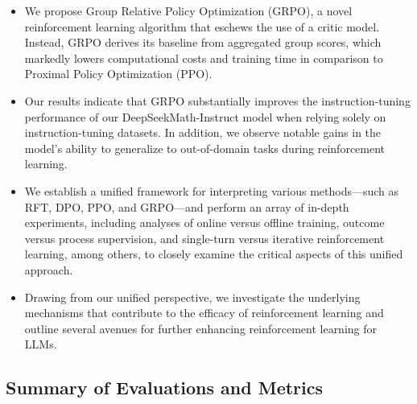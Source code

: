 \begin{itemize}[topsep=0pt]
    \item We propose Group Relative Policy Optimization (GRPO), a novel reinforcement learning algorithm that eschews the use of a critic model. Instead, GRPO derives its baseline from aggregated group scores, which markedly lowers computational costs and training time in comparison to Proximal Policy Optimization (PPO).
    \item Our results indicate that GRPO substantially improves the instruction-tuning performance of our DeepSeekMath-Instruct model when relying solely on instruction-tuning datasets. In addition, we observe notable gains in the model's ability to generalize to out-of-domain tasks during reinforcement learning.
    \item We establish a unified framework for interpreting various methods—such as RFT, DPO, PPO, and GRPO—and perform an array of in-depth experiments, including analyses of online versus offline training, outcome versus process supervision, and single-turn versus iterative reinforcement learning, among others, to closely examine the critical aspects of this unified approach.
    \item Drawing from our unified perspective, we investigate the underlying mechanisms that contribute to the efficacy of reinforcement learning and outline several avenues for further enhancing reinforcement learning for LLMs.
\end{itemize}

\subsection{Summary of Evaluations and Metrics}

